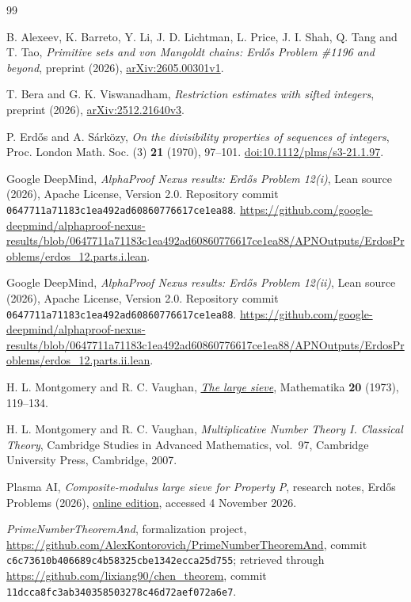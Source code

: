\begin{thebibliography}{99}

B. Alexeev, K. Barreto, Y. Li, J. D. Lichtman, L. Price,
J. I. Shah, Q. Tang and T. Tao,
\emph{Primitive sets and von Mangoldt chains: Erd\H{o}s Problem
\#1196 and beyond},
preprint (2026),
\href{https://arxiv.org/abs/2605.00301v1}{arXiv:2605.00301v1}.

T. Bera and G. K. Viswanadham,
\emph{Restriction estimates with sifted integers},
preprint (2026),
\href{https://arxiv.org/abs/2512.21640v3}{arXiv:2512.21640v3}.

P. Erd\H{o}s and A. S\'ark\"ozy,
\emph{On the divisibility properties of sequences of integers},
Proc. London Math. Soc. (3) \textbf{21} (1970), 97--101.
\href{https://doi.org/10.1112/plms/s3-21.1.97}{doi:10.1112/plms/s3-21.1.97}.

Google DeepMind,
\emph{AlphaProof Nexus results: Erd\H{o}s Problem 12(i)},
Lean source (2026), Apache License, Version 2.0.
Repository commit \nolinkurl{0647711a71183c1ea492ad60860776617ce1ea88}.
\url{https://github.com/google-deepmind/alphaproof-nexus-results/blob/0647711a71183c1ea492ad60860776617ce1ea88/APNOutputs/ErdosProblems/erdos_12.parts.i.lean}.

Google DeepMind,
\emph{AlphaProof Nexus results: Erd\H{o}s Problem 12(ii)},
Lean source (2026), Apache License, Version 2.0.
Repository commit \nolinkurl{0647711a71183c1ea492ad60860776617ce1ea88}.
\url{https://github.com/google-deepmind/alphaproof-nexus-results/blob/0647711a71183c1ea492ad60860776617ce1ea88/APNOutputs/ErdosProblems/erdos_12.parts.ii.lean}.

H. L. Montgomery and R. C. Vaughan,
\emph{\href{https://doi.org/10.1112/S0025579300004708}{The large sieve}},
Mathematika \textbf{20} (1973), 119--134.

H. L. Montgomery and R. C. Vaughan,
\emph{Multiplicative Number Theory I. Classical Theory},
Cambridge Studies in Advanced Mathematics, vol.~97,
Cambridge University Press, Cambridge, 2007.

Plasma AI,
\emph{Composite-modulus large sieve for Property P},
research notes, Erd\H{o}s Problems (2026),
\href{https://erdosproblems.ai/wiki/research/leads/property_p_sieve_multiplicity}{online edition},
accessed 4 November 2026.

\emph{PrimeNumberTheoremAnd}, formalization project,
\url{https://github.com/AlexKontorovich/PrimeNumberTheoremAnd},
commit \nolinkurl{c6c73610b406689c4b58325cbe1342ecca25d755};
retrieved through \url{https://github.com/lixiang90/chen_theorem},
commit \nolinkurl{11dcca8fc3ab340358503278c46d72aef072a6e7}.


\end{thebibliography}
